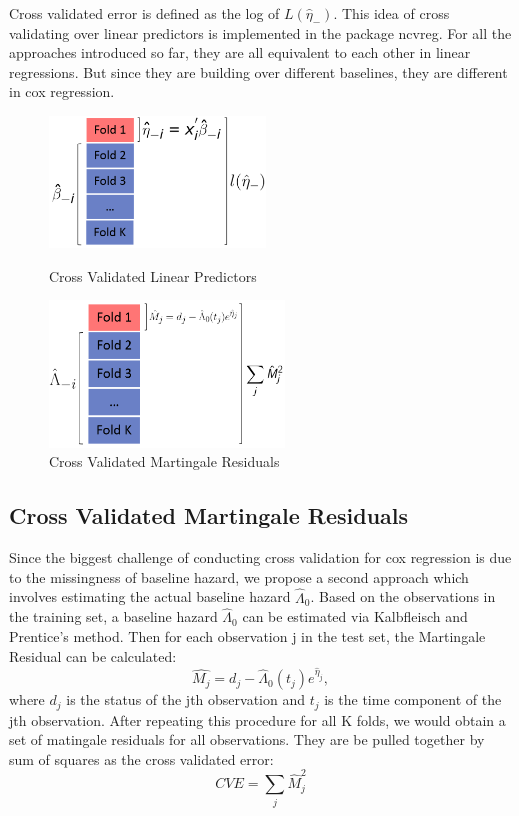 \documentclass{article}\usepackage[]{graphicx}\usepackage[]{color}
\begin{document}
Cross validated error is defined as the log of $L(\hat{\eta}_{-})$. This idea of cross validating over linear predictors is implemented in the package ncvreg. For all the approaches introduced so far, they are all equivalent to each other in linear regressions. But since they are building over different baselines, they are different in cox regression.

   \begin{figure}[h]
    \centering
    \begin{minipage}[b]{0.5\textwidth}
      \centering
		  \includegraphics[height= 3.5cm ]{./figures/03.png}
      \caption{Cross Validated Linear Predictors}
     \end{minipage}
     \begin{minipage}[b]{0.5\textwidth}
      \centering
		  \includegraphics[height= 3.9cm ]{./figures/04.png}
      \caption{Cross Validated Martingale Residuals}
      \end{minipage}	
   \end{figure}	
    
  \subsection{Cross Validated Martingale Residuals}
  
Since the biggest challenge of conducting cross validation for cox regression is due to the missingness of baseline hazard, we propose a second approach which involves estimating the actual baseline hazard $\hat{\Lambda}_{0}$. Based on the observations in the training set, a baseline hazard $\hat{\Lambda}_{0}$ can be estimated via Kalbfleisch and Prentice's method. Then for each observation j in the test set, the Martingale Residual can be calculated: \begin{equation}\hat{M_{j}} = d_{j} -\hat{\Lambda}_{0}(t_{j})e^{\hat{\eta}_{j}},\end{equation} where $d_{j}$ is the status of the jth observation and $t_{j}$ is the time component of the jth observation. After repeating this procedure for all K folds, we would obtain a set of matingale residuals for all observations. They are be pulled together by sum of squares as the cross validated error:
\begin{equation}CVE = \sum_{j}\hat{M}_{j}^2\end{equation}
\end{document}
